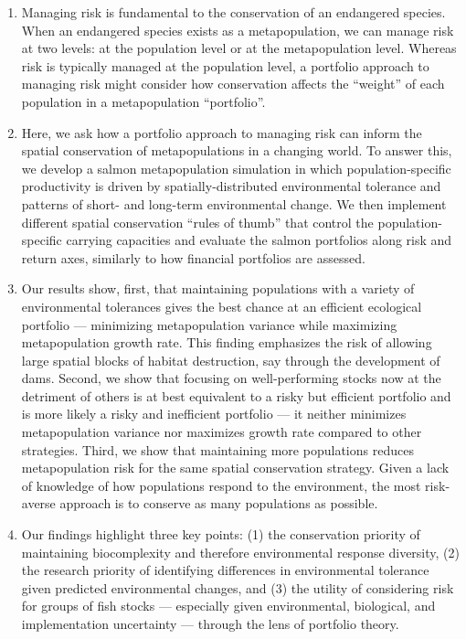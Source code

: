 \begin{enumerate}
\def\labelenumi{\arabic{enumi}.}
\item
  Managing risk is fundamental to the conservation of an endangered
  species. When an endangered species exists as a metapopulation, we can
  manage risk at two levels: at the population level or at the
  metapopulation level. Whereas risk is typically managed at the
  population level, a portfolio approach to managing risk might consider
  how conservation affects the ``weight'' of each population in a
  metapopulation ``portfolio''.
\item
  Here, we ask how a portfolio approach to managing risk can inform the
  spatial conservation of metapopulations in a changing world. To answer
  this, we develop a salmon metapopulation simulation in which
  population-specific productivity is driven by spatially-distributed
  environmental tolerance and patterns of short- and long-term
  environmental change. We then implement different spatial conservation
  ``rules of thumb'' that control the population-specific carrying
  capacities and evaluate the salmon portfolios along risk and return
  axes, similarly to how financial portfolios are assessed.
\item
  Our results show, first, that maintaining populations with a variety
  of environmental tolerances gives the best chance at an efficient
  ecological portfolio --- minimizing metapopulation variance while
  maximizing metapopulation growth rate. This finding emphasizes the
  risk of allowing large spatial blocks of habitat destruction, say
  through the development of dams. Second, we show that focusing on
  well-performing stocks now at the detriment of others is at best
  equivalent to a risky but efficient portfolio and is more likely a
  risky and inefficient portfolio --- it neither minimizes
  metapopulation variance nor maximizes growth rate compared to other
  strategies. Third, we show that maintaining more populations reduces
  metapopulation risk for the same spatial conservation strategy. Given
  a lack of knowledge of how populations respond to the environment, the
  most risk-averse approach is to conserve as many populations as
  possible.
\item
  Our findings highlight three key points: (1) the conservation priority
  of maintaining biocomplexity and therefore environmental response
  diversity, (2) the research priority of identifying differences in
  environmental tolerance given predicted environmental changes, and (3)
  the utility of considering risk for groups of fish stocks ---
  especially given environmental, biological, and implementation
  uncertainty --- through the lens of portfolio theory.
\end{enumerate}

